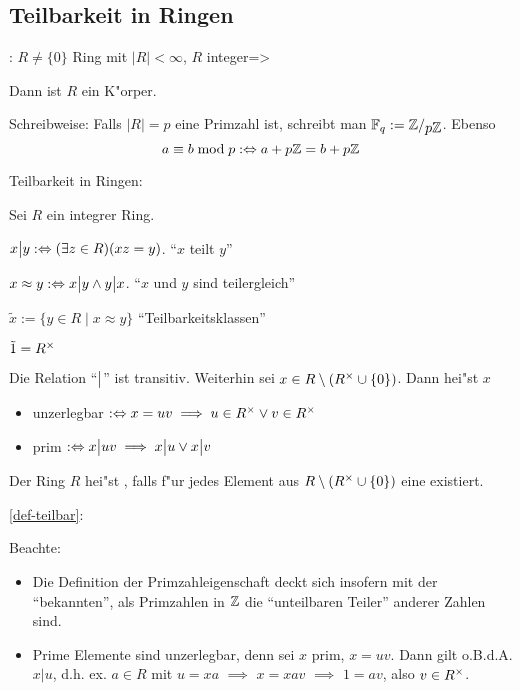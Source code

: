 \subsection{Teilbarkeit in Ringen}
\theorem: $R\ne\{0\}$ Ring mit $|R|<\infty$, $R$ integer=>{
  Dann ist $R$ ein K"orper.
  
  Schreibweise: Falls $|R|=p$ eine Primzahl ist, schreibt man 
  $\MBSet F_q:=\rcoset \SetZ {p \SetZ}$. Ebenso
  \[a\ident b \bmod p:\equiv a+p\SetZ=b+p\SetZ
    \]
  }
 Teilbarkeit in Ringen:{
  \label{def-teilbar}
  Sei $R$ ein integrer Ring.
  \begin{stmts}
    \item $x\big| y:\Leftrightarrow (\exists z\in R)(xz=y)$. ``$x$ teilt $y$''
    \item $x\approx y:\Leftrightarrow x\big| y \land y\big| x$. ``$x$ und $y$
      sind teilergleich''
    \item $\tilde x:=\{y\in R\mid x\approx y\}$ ``Teilbarkeitsklassen''
    \item $\tilde 1=R^\times$
    \end{stmts}
  Die Relation ``$\big|$'' ist transitiv. Weiterhin sei 
  $x\in R\setminus(R^\times\cup \{0\})$. Dann hei"st $x$
  \begin{itemize}
    \item {} unzerlegbar 
      $:\Leftrightarrow x=uv\implies u\in R^\times\lor v\in R^\times$
    \item {} prim 
      $:\Leftrightarrow x\big| uv\implies x\big| u\lor x\big| v$
    \end{itemize}
  Der Ring $R$ hei"st ,
  falls f"ur jedes Element aus $R\setminus(R^\times\cup \{0\})$
  eine  existiert.
  }
\annotation\ref{def-teilbar}:{
  Beachte:
  \begin{itemize}
    \item Die Definition der Primzahleigenschaft deckt sich insofern mit der 
      ``bekannten'', als Primzahlen in $\mathbb Z$ die ``unteilbaren Teiler''
      anderer Zahlen sind. 
    \item Prime Elemente sind unzerlegbar, denn sei $x$
      prim, $x=uv$. Dann gilt o.B.d.A. $x|u$, d.h. ex. $a\in R$ mit
      $u=xa$ $\implies$ $x=xav$ $\implies$ $1=av$, also $v\in R^\times$.
    \end{itemize}
  }
